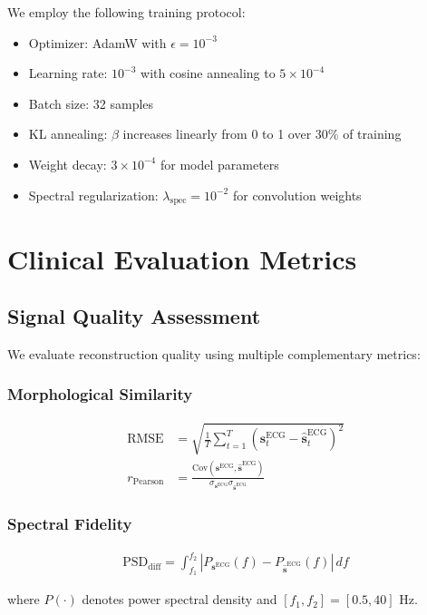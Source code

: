 \documentclass[11pt]{article}
\begin{document}
We employ the following training protocol:

\begin{itemize}
\item Optimizer: AdamW with $\epsilon = 10^{-3}$
\item Learning rate: $10^{-3}$ with cosine annealing to $5 \times 10^{-4}$
\item Batch size: 32 samples
\item KL annealing: $\beta$ increases linearly from 0 to 1 over 30\% of training
\item Weight decay: $3 \times 10^{-4}$ for model parameters
\item Spectral regularization: $\lambda_{\text{spec}} = 10^{-2}$ for convolution weights
\end{itemize}

\section{Clinical Evaluation Metrics}

\subsection{Signal Quality Assessment}

We evaluate reconstruction quality using multiple complementary metrics:

\subsubsection{Morphological Similarity}
\begin{align}
\text{RMSE} &= \sqrt{\frac{1}{T} \sum_{t=1}^{T} (\mathbf{s}^{\text{ECG}}_t - \hat{\mathbf{s}}^{\text{ECG}}_t)^2} \\
r_{\text{Pearson}} &= \frac{\text{Cov}(\mathbf{s}^{\text{ECG}}, \hat{\mathbf{s}}^{\text{ECG}})}{\sigma_{\mathbf{s}^{\text{ECG}}} \sigma_{\hat{\mathbf{s}}^{\text{ECG}}}}
\end{align}

\subsubsection{Spectral Fidelity}
\begin{align}
\text{PSD}_{\text{diff}} = \int_{f_1}^{f_2} |P_{\mathbf{s}^{\text{ECG}}}(f) - P_{\hat{\mathbf{s}}^{\text{ECG}}}(f)| \, df
\end{align}

where $P(\cdot)$ denotes power spectral density and $[f_1, f_2] = [0.5, 40]$ Hz.
\end{document}
